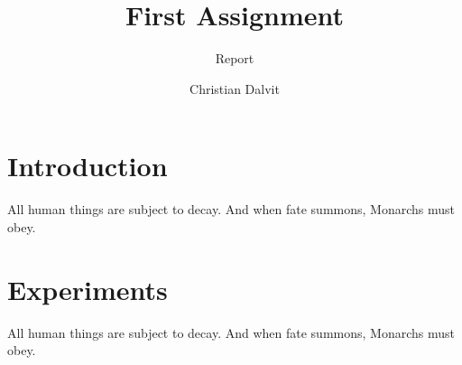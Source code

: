 \documentclass{scrartcl}
\title{First Assignment}
\subtitle{Report}
\author{Christian Dalvit}
\begin{document}
    \maketitle
    \begin{multicols}{2}
        \section{Introduction}    
        All human things are subject to decay. And when fate summons, Monarchs must obey.
        \section{Experiments}
        All human things are subject to decay. And when fate summons, Monarchs must obey.
    \end{multicols}
\end{document}
